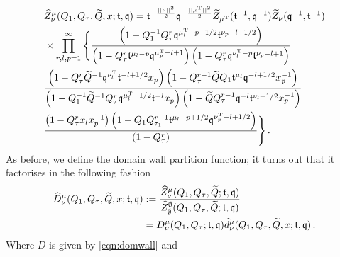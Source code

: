 \documentclass[main.tex]{subfiles}
\begin{document}
\begin{equation}
\begin{aligned}
&\widehat{Z}^{\mu}_{\nu}(Q_1,Q_{\tau},\widetilde{Q},x;\mathfrak{t},\mathfrak{q})=\mathfrak{t}^{-\frac{||\nu||^2}{2}}\mathfrak{q}^{-\frac{||\mu^{\operatorname{T}}||^2}{2}}\widetilde{Z}_{\mu^{\operatorname{T}}}(\mathfrak{t}^{-1},\mathfrak{q}^{-1})\widetilde{Z}_{\nu}(\mathfrak{q}^{-1},\mathfrak{t}^{-1})\\
&\times\prod_{r,l,p=1}^{\infty}\Bigg\{\frac{\left(1-Q_1^{-1}Q_{\tau}^{r}\mathfrak{q}^{\mu_l^{\operatorname{T}}-p+1/2}\mathfrak{t}^{\nu_p-l+1/2}\right)}{\left(1-Q_{\tau}^r\mathfrak{t}^{\mu_l-p}\mathfrak{q}^{\mu^{\operatorname{T}}_p-l+1}\right)\left(1-Q_{\tau}^r\mathfrak{q}^{\nu_l^{\operatorname{T}}-p}\mathfrak{t}^{\nu_p-l+1}\right)}\\
&\frac{\left(1-Q_{\tau}^{r}\widetilde{Q}^{-1}\mathfrak{q}^{\nu^{\operatorname{T}}_l}\mathfrak{t}^{-l+1/2}x_p\right)\left(1-Q_{\tau}^{r-1}\widetilde{Q}Q_1\mathfrak{t}^{\mu_l}\mathfrak{q}^{-l+1/2}x^{-1}_p\right)}{\left(1-Q_1^{-1}\widetilde{Q}^{-1}Q_{\tau}^{r}\mathfrak{q}^{\mu^{\operatorname{T}}_l+1/2}\mathfrak{t}^{-l}x_p\right)\left(1-\widetilde{Q}Q_{\tau}^{r-1}\mathfrak{q}^{-l}\mathfrak{t}^{\nu_l+1/2}x^{-1}_p\right)}\\
&\frac{\left(1-Q_{\tau}^{r}x_lx^{-1}_p\right)\left(1-Q_1Q^{r-1}_{\tau_1}\mathfrak{t}^{\mu_l-p+1/2}\mathfrak{q}^{\nu^{\operatorname{T}}_p-l+1/2}\right)}{\left(1-Q_{\tau}^r\right)}\Bigg\}\,.
\end{aligned}
\end{equation}
As before, we define the domain wall partition function; it turns out that it factorises in the following fashion
\begin{equation}
\begin{aligned}
\widehat{D}^{\mu}_{\nu}(Q_1,Q_{\tau},\widetilde{Q},x;\mathfrak{t},\mathfrak{q})&:=\frac{\widehat{Z}^{\mu}_{\nu}(Q_1,Q_{\tau},\widetilde{Q};\mathfrak{t},\mathfrak{q})}{\widehat{Z}^{\emptyset}_{\emptyset}(Q_1,Q_{\tau},\widetilde{Q};\mathfrak{t},\mathfrak{q})}\\
&=D^{\mu}_{\nu}(Q_1,Q_{\tau};\mathfrak{t},\mathfrak{q})\widehat{d}^{\mu}_{\nu}(Q_1,Q_{\tau},\widetilde{Q},x;\mathfrak{t},\mathfrak{q})\,.\label{eqn:A0minimaldom}
\end{aligned}
\end{equation}
Where $D$ is given by \eqref{eqn:domwall} and
\end{document}
